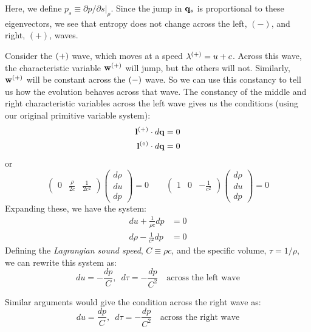 Here, we define $p_s \equiv \partial p/\partial s |_\rho$.
Since the jump in ${\bf q}_s$ is proportional to these eigenvectors, we see that
entropy does not change across the left, $(-)$, and right, $(+)$, waves.

Consider the ${(+)}$ wave, which moves at a speed $\lambda^{(+)} = u
+c$.  Across this wave, the characteristic variable ${\bf w}^{(+)}$ will
jump, but the others will not.  Similarly, ${\bf w}^{(+)}$ will be constant
across the ${(-)}$ wave.  So we can use this constancy to tell us how
the evolution behaves across that wave.  The constancy of the middle and right characteristic variables across the left
wave gives us the conditions (using our original primitive variable system):
\begin{align}
{\bf l}^{(+)} \cdot d{\bf q} &= 0 \\
{\bf l}^{(\circ)} \cdot d{\bf q} &= 0 
\end{align}
or 
\begin{equation}
\left ( \begin{array}{ccc} 0 & \frac{\rho}{2c} & \frac{1}{2c^2} \end{array} \right)
   \left ( \begin{array}{c} d\rho \\ du \\ dp \end{array} \right ) = 0
\qquad
%
\left ( \begin{array}{ccc} 1 & 0 & -\frac{1}{c^2} \end{array} \right)
   \left ( \begin{array}{c} d\rho \\ du \\ dp \end{array} \right ) = 0
\end{equation}
Expanding these, we have the system:
\begin{align}
du + \frac{1}{\rho c} dp &= 0 \\
d\rho - \frac{1}{c^2} dp &= 0 
\end{align}
Defining the {\em Lagrangian sound speed}, $C \equiv \rho c$, and the 
specific volume, $\tau = 1/\rho$, we can rewrite this system as:
\begin{equation}
du = -\frac{dp}{C} , \,\,\, d\tau = -\frac{dp}{C^2} \quad \mbox{across the left wave}
\end{equation}

Similar arguments would give the condition across the right wave as:
\begin{equation}
du = \frac{dp}{C} , \,\,\, d\tau = -\frac{dp}{C^2} \quad \mbox{across the right wave}
\end{equation}

